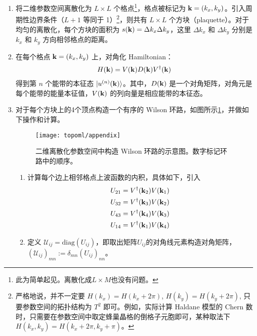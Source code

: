 \begin{enumerate}

\item 将二维参数空间离散化为 $L\times L$ 个格点\footnote{此为简单起见。离散化成$L\times M$也没有问题。}，格点被标记为 $\mathbf{k}=(k_x, k_y)$。引入周期性边界条件（$L+1$ 等同于 1）\footnote{严格地说，并不一定要 $H(k_x)=H(k_x+2\pi)$, $H(k_y)=H(k_y+2\pi)$, 只要参数空间的拓扑结构为 $T^2$ 即可。例如，实际计算 Haldane 模型的 Chern 数时，只需要在参数空间中取定蜂巢晶格的倒格子元胞即可，某种取法下 $H(k_x, k_y) = H(k_x + 2\pi, k_y + \pi)$。}，则共有 $L\times L$ 个方块（plaquette）。对于均匀的离散化，每个方块的面积为 $s(\mathbf{k})=\Delta k_x\Delta k_y$，这里 $\Delta k_x$ 和 $\Delta k_y$ 分别是 $k_x$ 和 $k_y$ 方向相邻格点的距离。

\item 在每个格点 $\mathbf{k}=(k_x, k_y)$ 上，对角化 Hamiltonian：
\begin{align}
H(\mathbf{k}) = V(\mathbf{k})D(\mathbf{k})V^{\dagger}(\mathbf{k})
\end{align}
得到第 $n$ 个能带的本征态 $|u^{(n)}(\mathbf{k})\rangle$。其中，$D(\mathbf{k})$ 是一个对角矩阵，对角元是每个能带的能量本征值，$V(\mathbf{k})$ 的列向量是相应能带的本征态。

\item 对于每个方块上的4个顶点构造一个有序的 Wilson 环路，如图所示\ref{fig:topoml-appendix}，并做如下操作和计算。
\begin{figure}
\centering
\texttt{[image: topoml/appendix]}
\caption{二维离散化参数空间中构造 Wilson 环路的示意图。数字标记环路中的顺序。}\label{fig:topoml-appendix}
\end{figure}

\begin{enumerate}

\item 计算每个边上相邻格点上波函数的内积，具体如下，引入
\begin{align}
U_{21} &= V^{\dagger}(\mathbf{k}_2) V(\mathbf{k}_1) \\ 
U_{32} &= V^{\dagger}(\mathbf{k}_3) V(\mathbf{k}_2) \\ 
U_{43} &= V^{\dagger}(\mathbf{k}_4) V(\mathbf{k}_3) \\ 
U_{14} &= V^{\dagger}(\mathbf{k}_1) V(\mathbf{k}_4) 
\end{align}

\item 定义 $\mathcal{U}_{ij} = \text{diag}(U_{ij})$，即取出矩阵$U_{ij}$的对角线元素构造对角矩阵，$(\mathcal{U}_{ij})_{mn}:=\delta_{mn}(U_{ij})_{nn}$。


\end{enumerate}
\end{enumerate}

